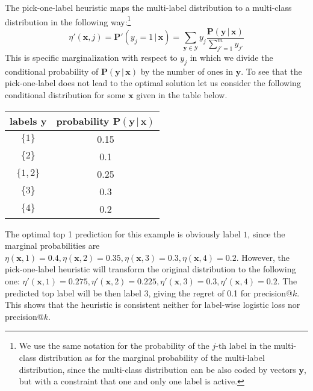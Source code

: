 \documentclass{article}
\renewcommand{\vec}[1]{\boldsymbol{#1}}
\newcommand{\bx}{\vec{x}}
\newcommand{\by}{\vec{y}}
\newcommand{\calY}{\mathcal{Y}}
\newcommand{\prob}{\mathbf{P}}
\newcommand{\given}{\, | \,}
\begin{document}
The pick-one-label heuristic maps the multi-label distribution to a multi-class distribution in the following way:\footnote{We use the same notation for the probability of the $j$-th label in the multi-class distribution as for the marginal probability of the multi-label distribution, since the multi-class distribution can be also coded by vectors $\by$, but with a constraint that one and only one label is active.}
\begin{equation}
\eta'(\bx, j) = \prob'(y_j = 1 \given \bx) = \sum_{\by \in \calY} y_j \frac{\prob(\by \given \bx)}{\sum_{j'=1}^m y_{j'}}
\label{eq:heuristic}
\end{equation}
This is specific marginalization with respect to $y_j$ in which we divide the conditional probability of  $\prob(\by \given \bx)$ by the number of ones in $\by$. To see that the pick-one-label does not lead to the optimal solution let us consider the following conditional distribution for some $\bx$ given in the table below.
\begin{center}
\begin{tabular}{c c}
\toprule
labels $\by$ & probability $\prob(\by \given \bx)$ \\
\midrule
$\{1\}$ & 0.15 \\
$\{2\}$ & 0.1 \\
$\{1, 2\}$ & 0.25 \\
$\{3\}$ & 0.3 \\
$\{4\}$ & 0.2 \\
\bottomrule
\end{tabular}
\end{center}
The optimal top 1 prediction for this example is obviously label $1$, since the marginal probabilities are $\eta(\bx,1) = 0.4, \eta(\bx,2) = 0.35,  \eta(\bx,3) = 0.3, \eta(\bx,4) =0.2$. However, the pick-one-label heuristic will transform the original distribution to the following one: $\eta'(\bx,1) = 0.275, \eta'(\bx,2) = 0.225,  \eta'(\bx,3) = 0.3, \eta'(\bx,4) =0.2$. The predicted top label will be then label $3$, giving the regret of 0.1 for precision@$k$. This shows that the heuristic is consistent neither for label-wise logistic loss nor precision@$k$. 

\end{document}
